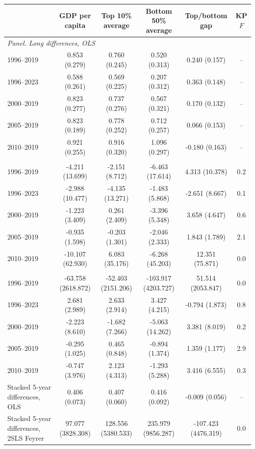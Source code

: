 \begin{tabular}{lccccc}
\toprule
 & GDP per capita & Top 10\% average & Bottom 50\% average & Top/bottom gap & KP $F$ \\
\midrule
\multicolumn{6}{l}{\emph{Panel. Long differences, OLS}}\\
1996--2019 & 0.853\sym{***} (0.279) & 0.760\sym{***} (0.245) & 0.520 (0.313) & 0.240 (0.157) & -- \\
1996--2023 & 0.588\sym{**} (0.261) & 0.569\sym{**} (0.225) & 0.207 (0.312) & 0.363\sym{**} (0.148) & -- \\
2000--2019 & 0.823\sym{***} (0.277) & 0.737\sym{***} (0.276) & 0.567\sym{*} (0.321) & 0.170 (0.132) & -- \\
2005--2019 & 0.823\sym{***} (0.189) & 0.778\sym{***} (0.252) & 0.712\sym{***} (0.257) & 0.066 (0.153) & -- \\
2010--2019 & 0.921\sym{***} (0.255) & 0.916\sym{***} (0.320) & 1.096\sym{***} (0.297) & -0.180 (0.163) & -- \\
\addlinespace
\multicolumn{6}{l}{\emph{Panel. Long differences, 2SLS, Feyrer}}\\
1996--2019 & -4.211 (13.699) & -2.151 (8.712) & -6.463 (17.614) & 4.313 (10.378) & 0.2 \\
1996--2023 & -2.988 (10.477) & -4.135 (13.271) & -1.483 (5.868) & -2.651 (8.667) & 0.1 \\
2000--2019 & -1.223 (3.409) & 0.261 (2.409) & -3.396 (5.348) & 3.658 (4.647) & 0.6 \\
2005--2019 & -0.935 (1.598) & -0.203 (1.301) & -2.046 (2.333) & 1.843 (1.789) & 2.1 \\
2010--2019 & -10.107 (62.930) & 6.083 (35.176) & -6.268 (45.203) & 12.351 (75.871) & 0.0 \\
\addlinespace
\multicolumn{6}{l}{\emph{Panel. Long differences, 2SLS, tourism}}\\
1996--2019 & -63.758 (2618.872) & -52.403 (2151.206) & -103.917 (4203.727) & 51.514 (2053.847) & 0.0 \\
1996--2023 & 2.681 (2.989) & 2.633 (2.914) & 3.427 (4.215) & -0.794 (1.873) & 0.8 \\
2000--2019 & -2.223 (8.610) & -1.682 (7.266) & -5.063 (14.262) & 3.381 (8.019) & 0.2 \\
2005--2019 & -0.295 (1.025) & 0.465 (0.848) & -0.894 (1.374) & 1.359 (1.177) & 2.9 \\
2010--2019 & -0.747 (3.976) & 2.123 (4.313) & -1.293 (5.288) & 3.416 (6.555) & 0.3 \\
\addlinespace
Stacked 5-year differences, OLS & 0.406\sym{***} (0.073) & 0.407\sym{***} (0.060) & 0.416\sym{***} (0.092) & -0.009 (0.056) & -- \\
Stacked 5-year differences, 2SLS Feyrer & 97.077 (3828.308) & 128.556 (5380.533) & 235.979 (9856.287) & -107.423 (4476.319) & 0.0 \\
\bottomrule
\end{tabular}